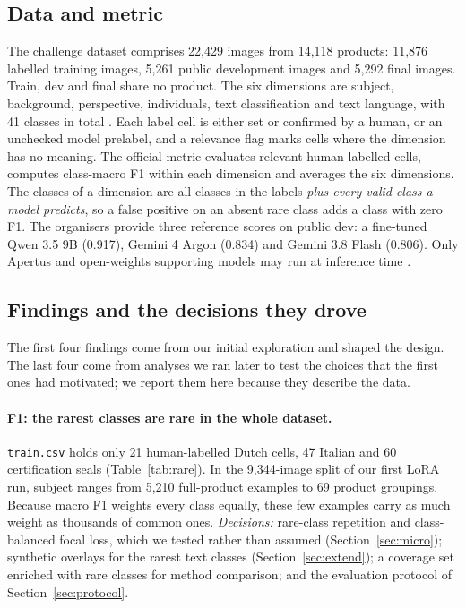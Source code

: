 \documentclass[11pt]{article}
\begin{document}
\subsection{Data and metric}
The challenge dataset comprises 22,429 images from 14,118 products: 11,876 labelled training images, 5,261 public development images and 5,292 final images. Train, dev and final share no product. The six dimensions are subject, background, perspective, individuals, text classification and text language, with 41 classes in total \cite{challenge}. Each label cell is either set or confirmed by a human, or an unchecked model prelabel, and a relevance flag marks cells where the dimension has no meaning. The official metric evaluates relevant human-labelled cells, computes class-macro F1 within each dimension and averages the six dimensions. The classes of a dimension are all classes in the labels \emph{plus every valid class a model predicts}, so a false positive on an absent rare class adds a class with zero F1. The organisers provide three reference scores on public dev: a fine-tuned Qwen 3.5 9B (0.917), Gemini 4 Argon (0.834) and Gemini 3.8 Flash (0.806). Only Apertus and open-weights supporting models may run at inference time \cite{challenge}.

\subsection{Findings and the decisions they drove}
The first four findings come from our initial exploration and shaped the design. The last four come from analyses we ran later to test the choices that the first ones had motivated; we report them here because they describe the data.

\paragraph{F1: the rarest classes are rare in the whole dataset.} \texttt{train.csv} holds only 21 human-labelled Dutch cells, 47 Italian and 60 certification seals (Table~\ref{tab:rare}). In the 9,344-image split of our first LoRA run, subject ranges from 5,210 full-product examples to 69 product groupings. Because macro F1 weights every class equally, these few examples carry as much weight as thousands of common ones. \emph{Decisions:} rare-class repetition and class-balanced focal loss, which we tested rather than assumed (Section~\ref{sec:micro}); synthetic overlays for the rarest text classes (Section~\ref{sec:extend}); a coverage set enriched with rare classes for method comparison; and the evaluation protocol of Section~\ref{sec:protocol}.
\end{document}

